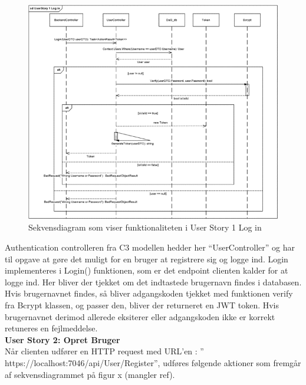 \begin{figure}[H]
\centering
\includegraphics[width = \textwidth]{02-Body/Images/Backend_sekvens_1.PNG}
\caption{Sekvensdiagram som viser funktionaliteten i User Story 1 Log in}
\label{fig:Design-Backend-Sekvens-1}
\end{figure}

Authentication controlleren fra C3 modellen hedder her “UserController” og har til opgave at gøre det muligt for en bruger at registrere sig og logge ind. Login implementeres i Login() funktionen, som er det endpoint clienten kalder for at logge ind. Her bliver der tjekket om det indtastede brugernavn findes i databasen. Hvis brugernavnet findes, så bliver adgangskoden tjekket med funktionen verify fra Bcrypt klassen, og passer den, bliver der returneret en JWT token. Hvis brugernavnet derimod allerede eksiterer eller adgangskoden ikke er korrekt retuneres en fejlmeddelse.\\

\textbf{User Story 2: Opret Bruger}\\
Når clienten udfører en HTTP request med URL’en : ” https://localhost:7046/api/User/Register”, udføres følgende aktioner som fremgår af sekvensdiagrammet på figur x (mangler ref).\\

